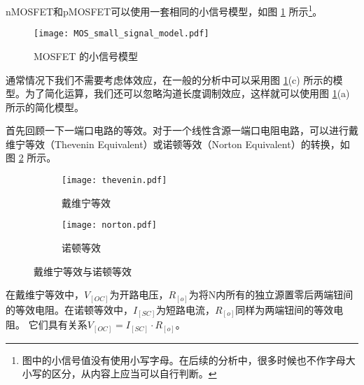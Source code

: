 nMOSFET和pMOSFET可以使用一套相同的小信号模型，如图 \ref{fig:mosfet-small-signal-model} 所示\footnote{图中的小信号值没有使用小写字母。在后续的分析中，很多时候也不作字母大小写的区分，从内容上应当可以自行判断。}。
\begin{figure}[!htb]
    \centering
    \texttt{[image: MOS\_small\_signal\_model.pdf]}
    \caption{MOSFET 的小信号模型\cite{Analog-CMOS}}
    \label{fig:mosfet-small-signal-model}
\end{figure}
通常情况下我们不需要考虑体效应，在一般的分析中可以采用图 \ref{fig:mosfet-small-signal-model}(c) 所示的模型。为了简化运算，我们还可以忽略沟道长度调制效应，这样就可以使用图 \ref{fig:mosfet-small-signal-model}(a) 所示的简化模型。





\newpage
首先回顾一下一端口电路的等效。对于一个线性含源一端口电阻电路，可以进行戴维宁等效（Thevenin Equivalent）或诺顿等效（Norton Equivalent）的转换，如图 \ref{fig:thevenin-norton-equivalent} 所示。
\begin{figure}[!htb]
    \centering
    \begin{subfigure}[b]{\textwidth}
        \centering
        \texttt{[image: thevenin.pdf]}
        \caption{戴维宁等效}
    \end{subfigure}
    \begin{subfigure}[b]{\linewidth}
        \centering
        \texttt{[image: norton.pdf]}
        \caption{诺顿等效}
    \end{subfigure}
    \caption{戴维宁等效与诺顿等效}
    \label{fig:thevenin-norton-equivalent}
\end{figure}

在戴维宁等效中，$V_[OC]$为开路电压，$R_[o]$为将N内所有的独立源置零后两端钮间的等效电阻。在诺顿等效中，$I_[SC]$为短路电流，$R_[o]$同样为两端钮间的等效电阻。
它们具有关系$V_[OC] = I_[SC] \cdot R_[o]$。

